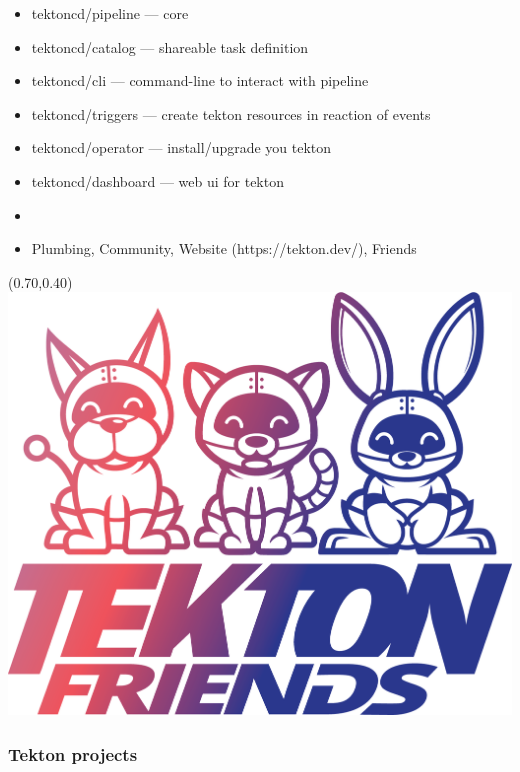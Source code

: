 \documentclass[aspectratio=169,11pt,hyperref={colorlinks=true}]{beamer}
\begin{document}
\begin{blackframe}
\begin{2columnsmoreleftframe}
  {
  \begin{itemize}
    \item tektoncd/pipeline — core
    \item tektoncd/catalog — shareable task definition
    \item tektoncd/cli — command-line to interact with pipeline
    \item tektoncd/triggers — create tekton resources in reaction of events
    \item tektoncd/operator — install/upgrade you tekton
    \item tektoncd/dashboard — web ui for tekton
    \item[]
    \item Plumbing, Community, Website (https://tekton.dev/), Friends
  \end{itemize}
  }
  {
  \begin{textblock*}{0.25\paperwidth}(0.70\paperwidth,0.40\paperheight)
    \centering
    \includegraphics[width=0.25\paperwidth]{img/tekton-friends.png}
  \end{textblock*}
  }
  \frametitle{Tekton projects}
\end{2columnsmoreleftframe}


\end{blackframe}
\end{document}
